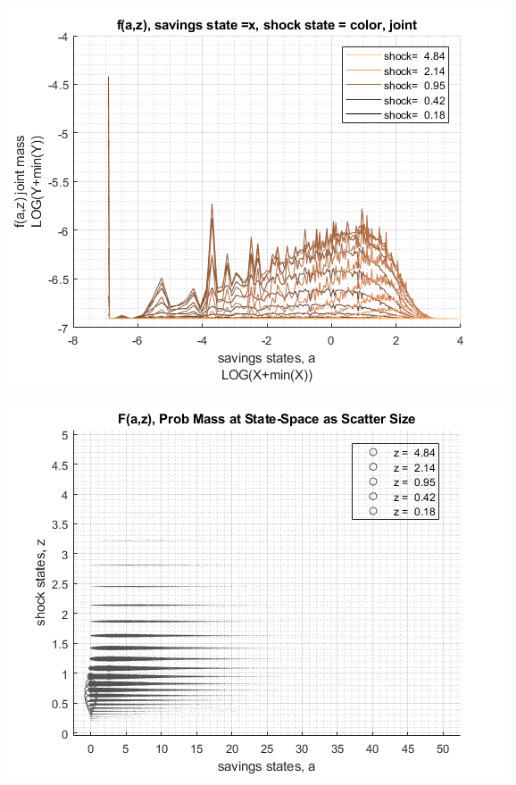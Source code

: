 \documentclass[
]{book}
\begin{document}
\includegraphics[width=5.20833in,height=\textheight]{img/fx_ds_az_loop_images/figure_10.png}

\includegraphics[width=5.20833in,height=\textheight]{img/fx_ds_az_loop_images/figure_11.png}
\end{document}
